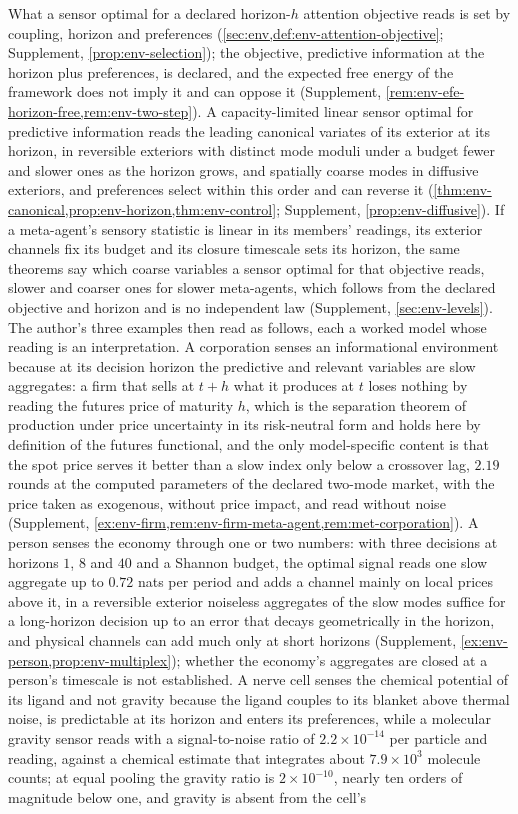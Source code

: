 What a sensor optimal for a declared horizon-$h$ attention objective reads is set by coupling, horizon and preferences (\cref{sec:env,def:env-attention-objective}; Supplement, \cref{prop:env-selection}); the objective, predictive information at the horizon plus preferences, is declared, and the expected free energy of the framework does not imply it and can oppose it (Supplement, \cref{rem:env-efe-horizon-free,rem:env-two-step}). A capacity-limited linear sensor optimal for predictive information reads the leading canonical variates of its exterior at its horizon, in reversible exteriors with distinct mode moduli under a budget fewer and slower ones as the horizon grows, and spatially coarse modes in diffusive exteriors, and preferences select within this order and can reverse it (\cref{thm:env-canonical,prop:env-horizon,thm:env-control}; Supplement, \cref{prop:env-diffusive}). If a meta-agent's sensory statistic is linear in its members' readings, its exterior channels fix its budget and its closure timescale sets its horizon, the same theorems say which coarse variables a sensor optimal for that objective reads, slower and coarser ones for slower meta-agents, which follows from the declared objective and horizon and is no independent law (Supplement, \cref{sec:env-levels}). The author's three examples then read as follows, each a worked model whose reading is an interpretation. A corporation senses an informational environment because at its decision horizon the predictive and relevant variables are slow aggregates: a firm that sells at $t+h$ what it produces at $t$ loses nothing by reading the futures price of maturity $h$, which is the separation theorem of production under price uncertainty in its risk-neutral form \citep{feder1980futures} and holds here by definition of the futures functional, and the only model-specific content is that the spot price serves it better than a slow index only below a crossover lag, $2.19$ rounds at the computed parameters of the declared two-mode market, with the price taken as exogenous, without price impact, and read without noise (Supplement, \cref{ex:env-firm,rem:env-firm-meta-agent,rem:met-corporation}). A person senses the economy through one or two numbers: with three decisions at horizons $1$, $8$ and $40$ and a Shannon budget, the optimal signal reads one slow aggregate up to $0.72$ nats per period and adds a channel mainly on local prices above it, in a reversible exterior noiseless aggregates of the slow modes suffice for a long-horizon decision up to an error that decays geometrically in the horizon, and physical channels can add much only at short horizons (Supplement, \cref{ex:env-person,prop:env-multiplex}); whether the economy's aggregates are closed at a person's timescale is not established. A nerve cell senses the chemical potential of its ligand and not gravity because the ligand couples to its blanket above thermal noise, is predictable at its horizon and enters its preferences, while a molecular gravity sensor reads with a signal-to-noise ratio of $2.2\times10^{-14}$ per particle and reading, against a chemical estimate that integrates about $7.9\times10^3$ molecule counts; at equal pooling the gravity ratio is $2\times10^{-10}$, nearly ten orders of magnitude below one, and gravity is absent from the cell's 